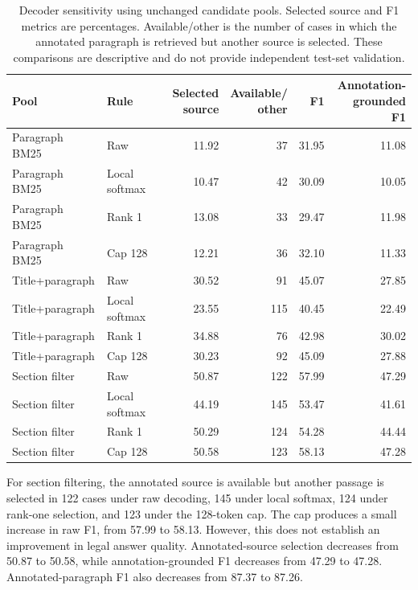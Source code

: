 \documentclass[pdflatex,sn-basic]{sn-jnl}%
\theoremstyle{thmstyleone}%
\theoremstyle{thmstyletwo}%
\theoremstyle{thmstylethree}%
\begin{document}
\begin{table}[!htbp]
    \caption{Decoder sensitivity using unchanged candidate pools. Selected
    source and F1 metrics are percentages. Available/other is the number of
    cases in which the annotated paragraph is retrieved but another source is
    selected. These comparisons are descriptive and do not provide independent
    test-set validation.}
    \label{tab:decoder_sensitivity}
    \centering
    \scriptsize
    \setlength{\tabcolsep}{3.5pt}
    \begin{tabular}{@{}llrrrr@{}}
        \toprule
        Pool & Rule
        & \shortstack{Selected\\source}
        & \shortstack{Available/\\other}
        & F1
        & \shortstack{Annotation-\\grounded F1} \\
        \midrule
        Paragraph BM25 & Raw           & 11.92 & 37 & 31.95 & 11.08 \\
        Paragraph BM25 & Local softmax & 10.47 & 42 & 30.09 & 10.05 \\
        Paragraph BM25 & Rank 1        & 13.08 & 33 & 29.47 & 11.98 \\
        Paragraph BM25 & Cap 128       & 12.21 & 36 & 32.10 & 11.33 \\
        \midrule
        Title+paragraph & Raw           & 30.52 & 91  & 45.07 & 27.85 \\
        Title+paragraph & Local softmax & 23.55 & 115 & 40.45 & 22.49 \\
        Title+paragraph & Rank 1        & 34.88 & 76  & 42.98 & 30.02 \\
        Title+paragraph & Cap 128       & 30.23 & 92  & 45.09 & 27.88 \\
        \midrule
        Section filter & Raw           & 50.87 & 122 & 57.99 & 47.29 \\
        Section filter & Local softmax & 44.19 & 145 & 53.47 & 41.61 \\
        Section filter & Rank 1        & 50.29 & 124 & 54.28 & 44.44 \\
        Section filter & Cap 128       & 50.58 & 123 & 58.13 & 47.28 \\
        \bottomrule
    \end{tabular}
\end{table}

For section filtering, the annotated source is available but another passage
is selected in 122 cases under raw decoding, 145 under local softmax, 124 under
rank-one selection, and 123 under the 128-token cap. The cap produces a small
increase in raw F1, from 57.99 to 58.13. However, this does not establish an
improvement in legal answer quality. Annotated-source selection decreases from
50.87 to 50.58, while annotation-grounded F1 decreases from 47.29 to 47.28.
Annotated-paragraph F1 also decreases from 87.37 to 87.26.
\end{document}

